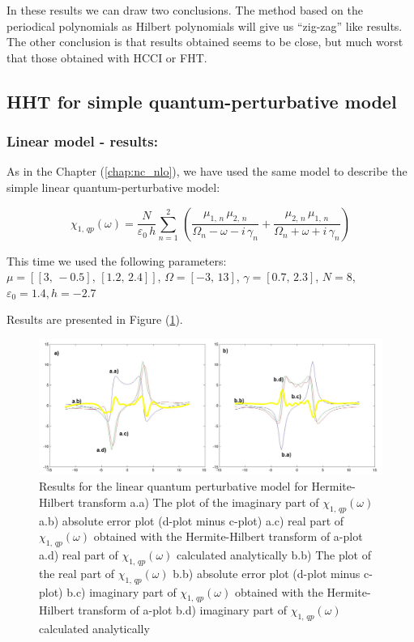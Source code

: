 \documentclass[12pt,twoside,a4paper]{article}
\numberwithin{equation}{subsection}
\numberwithin{figure}{subsection}
\begin{document}
In these results we can draw two conclusions. The method based on the periodical polynomials as Hilbert polynomials will
give us ``zig-zag'' like results. The other conclusion is that results obtained seems to be close, but much worst that those
obtained with HCCI or FHT. 

\subsection{HHT for simple quantum-perturbative model} \label{chap:hermite_quantum}

\subsubsection*{Linear model - results:}

As in the Chapter (\ref{chap:nc_nlo}), we have used the same model to describe the simple linear quantum-perturbative model: 

\begin{equation} \label{eq:hht_qp}
  {\chi_{1, \,qp}}(\omega ) = \frac {N}{\varepsilon_0\,h} \sum_{n=1}^{2}\,(\frac {{\mu_{1, \,n}}\,{ \mu_{2, \,n}}}{{\Omega_{n}}
  - \omega  - i\,{\gamma_{n}}} + \frac {{\mu_{2, \,n}}\,{\mu_{1, \,n}}}{{\Omega_{n}} + \omega + i\,{\gamma_{n}}})
\end{equation}

This time we used the following parameters: \\
$\mu = [[3, \, - 0.5], \,[1.2, \,2.4]]$, 
$\Omega =[ - 3, \,13]$, 
$\gamma =[0.7, \,2.3]$,  
$N=8$, 
${\varepsilon_{0}}=1.4, 
h= - 2.7$

Results are presented in Figure (\ref{fig:hht_qp1}). 

\begin{figure}
  \includegraphics[width=150mm]{img/hht_qp1.png}
  \caption{Results for the linear quantum perturbative model for Hermite-Hilbert transform
    a.a) The plot of the imaginary part of ${\chi_{1, \,qp}}(\omega )$
    a.b) absolute error plot (d-plot minus c-plot) 
    a.c) real part of ${\chi_{1, \, qp}}(\omega )$ obtained with the Hermite-Hilbert transform of a-plot 
    a.d) real part of ${\chi_{1, \, qp}}(\omega )$ calculated analytically 
    b.b) The plot of the real part of ${\chi_{1, \, qp}}(\omega )$ 
    b.b) absolute error plot (d-plot minus c-plot) 
    b.c) imaginary part of ${\chi_{1, \, qp}}(\omega )$ obtained with the Hermite-Hilbert transform of a-plot 
    b.d) imaginary part of ${\chi_{1, \, qp}}(\omega )$ calculated analytically  
    \label{fig:hht_qp1}
  }
\end{figure}
\end{document}

